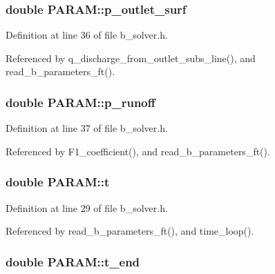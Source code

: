 \hypertarget{struct_p_a_r_a_m_a4fa2089e6333f92dec67602b9c2bdcf1}{
\subsubsection[{p\-\_\-outlet\-\_\-surf}]{\setlength{\rightskip}{0pt plus 5cm}double P\-A\-R\-A\-M\-::p\-\_\-outlet\-\_\-surf}}\label{struct_p_a_r_a_m_a4fa2089e6333f92dec67602b9c2bdcf1}


Definition at line 36 of file b\-\_\-solver.\-h.



Referenced by q\-\_\-discharge\-\_\-from\-\_\-outlet\-\_\-subs\-\_\-line(), and read\-\_\-b\-\_\-parameters\-\_\-ft().

\hypertarget{struct_p_a_r_a_m_a6c7a02f7ff4c8f020d305d75d41bedb1}{
\subsubsection[{p\-\_\-runoff}]{\setlength{\rightskip}{0pt plus 5cm}double P\-A\-R\-A\-M\-::p\-\_\-runoff}}\label{struct_p_a_r_a_m_a6c7a02f7ff4c8f020d305d75d41bedb1}


Definition at line 37 of file b\-\_\-solver.\-h.



Referenced by F1\-\_\-coefficient(), and read\-\_\-b\-\_\-parameters\-\_\-ft().

\hypertarget{struct_p_a_r_a_m_a8a3cde045b4e45360640476e83c239d8}{
\subsubsection[{t}]{\setlength{\rightskip}{0pt plus 5cm}double P\-A\-R\-A\-M\-::t}}\label{struct_p_a_r_a_m_a8a3cde045b4e45360640476e83c239d8}


Definition at line 29 of file b\-\_\-solver.\-h.



Referenced by read\-\_\-b\-\_\-parameters\-\_\-ft(), and time\-\_\-loop().

\hypertarget{struct_p_a_r_a_m_a93e536551277d6840879ceb33bb20a33}{
\subsubsection[{t\-\_\-end}]{\setlength{\rightskip}{0pt plus 5cm}double P\-A\-R\-A\-M\-::t\-\_\-end}}\label{struct_p_a_r_a_m_a93e536551277d6840879ceb33bb20a33}


